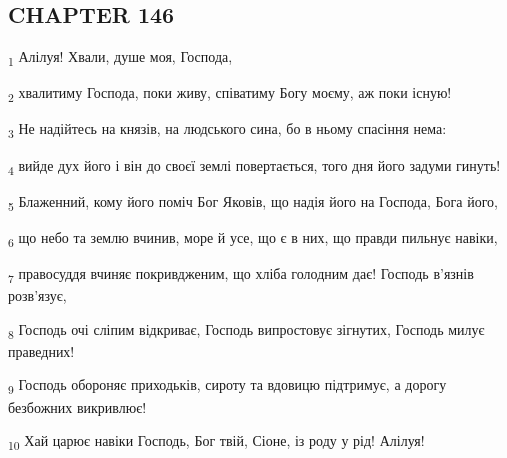 \subsection{CHAPTER 146}
\begin{tcolorbox}
\textsubscript{1} Алілуя! Хвали, душе моя, Господа,
\end{tcolorbox}
\begin{tcolorbox}
\textsubscript{2} хвалитиму Господа, поки живу, співатиму Богу моєму, аж поки існую!
\end{tcolorbox}
\begin{tcolorbox}
\textsubscript{3} Не надійтесь на князів, на людського сина, бо в ньому спасіння нема:
\end{tcolorbox}
\begin{tcolorbox}
\textsubscript{4} вийде дух його і він до своєї землі повертається, того дня його задуми гинуть!
\end{tcolorbox}
\begin{tcolorbox}
\textsubscript{5} Блаженний, кому його поміч Бог Яковів, що надія його на Господа, Бога його,
\end{tcolorbox}
\begin{tcolorbox}
\textsubscript{6} що небо та землю вчинив, море й усе, що є в них, що правди пильнує навіки,
\end{tcolorbox}
\begin{tcolorbox}
\textsubscript{7} правосуддя вчиняє покривдженим, що хліба голодним дає! Господь в'язнів розв'язує,
\end{tcolorbox}
\begin{tcolorbox}
\textsubscript{8} Господь очі сліпим відкриває, Господь випростовує зігнутих, Господь милує праведних!
\end{tcolorbox}
\begin{tcolorbox}
\textsubscript{9} Господь обороняє приходьків, сироту та вдовицю підтримує, а дорогу безбожних викривлює!
\end{tcolorbox}
\begin{tcolorbox}
\textsubscript{10} Хай царює навіки Господь, Бог твій, Сіоне, із роду у рід! Алілуя!
\end{tcolorbox}
